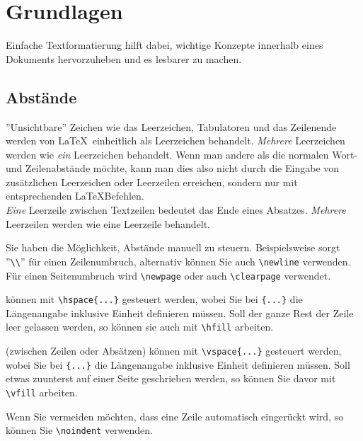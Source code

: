 \section{Grundlagen}
Einfache Textformatierung hilft dabei, wichtige Konzepte innerhalb eines Dokuments hervorzuheben und es lesbarer zu machen.

\subsection{Abstände}
''Unsichtbare'' Zeichen wie das Leerzeichen, Tabulatoren und das Zeilenende werden von \LaTeX\ einheitlich als Leerzeichen behandelt. \emph{Mehrere} Leerzeichen werden wie \emph{ein} Leerzeichen behandelt. Wenn man andere als die normalen Wort- und Zeilenabstände möchte, kann man dies also nicht durch die Eingabe von zusätzlichen Leerzeichen oder Leerzeilen erreichen, sondern nur mit entsprechenden \LaTeX\-Befehlen.\\
\emph{Eine} Leerzeile zwischen Textzeilen bedeutet das Ende eines Absatzes. \emph{Mehrere} Leerzeilen werden wie eine Leerzeile behandelt.

\vspace{3mm}
\noindent Sie haben die Möglichkeit, Abstände manuell zu steuern. Beispielsweise sorgt ''\verb|\\|'' für einen Zeilenumbruch, alternativ können Sie auch \verb|\newline| verwenden.\\
Für einen Seitenumbruch wird \verb|\newpage| oder auch \verb|\clearpage| verwendet.

\vspace{3mm}
 können mit \verb|\hspace{...}| gesteuert werden, wobei Sie bei \verb|{...}| die Längenangabe inklusive Einheit definieren müssen. Soll der ganze Rest der Zeile leer gelassen werden, so können sie auch mit \verb|\hfill| arbeiten.

 (zwischen Zeilen oder Absätzen) können mit \verb|\vspace{...}| gesteuert werden, wobei Sie bei \verb|{...}| die Längenangabe inklusive Einheit definieren müssen. Soll etwas zuunterst auf einer Seite geschrieben werden, so können Sie davor mit \verb|\vfill| arbeiten.

\vspace{3mm}
\noindent Wenn Sie vermeiden möchten, dass eine Zeile automatisch eingerückt wird, so können Sie \verb|\noindent| verwenden.


